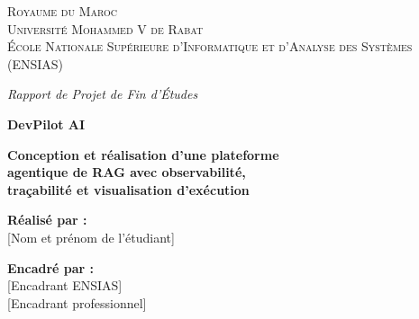\documentclass[12pt,a4paper,oneside]{report}
\begin{document}

\begin{titlepage}
\centering\thispagestyle{empty}
{\small\scshape Royaume du Maroc\\ Université Mohammed V de Rabat\\
École Nationale Supérieure d'Informatique et d'Analyse des Systèmes (ENSIAS)\par}
\vspace{0.8cm}{\color{lineGray}\rule{\textwidth}{0.5pt}}\vspace{1.0cm}

{\small\itshape Rapport de Projet de Fin d'Études\par}
\vspace{0.3cm}{\small en vue de l'obtention du diplôme d'Ingénieur d'État\par}

\vspace{1.4cm}
{\color{brand}\Huge\bfseries DevPilot AI\par}
\vspace{0.5cm}
{\LARGE\bfseries Conception et réalisation d'une plateforme\\[4pt]
agentique de RAG avec observabilité,\\[4pt]
traçabilité et visualisation d'exécution\par}

\vspace{1.6cm}{\color{lineGray}\rule{0.6\textwidth}{0.5pt}}\vspace{0.5cm}
\begin{minipage}{0.46\textwidth}\begin{flushleft}\large
\textbf{Réalisé par :}\\[2pt][Nom et prénom de l'étudiant]\end{flushleft}\end{minipage}\hfill
\begin{minipage}{0.46\textwidth}\begin{flushright}\large
\textbf{Encadré par :}\\[2pt][Encadrant ENSIAS]\\{[Encadrant professionnel]}\end{flushright}\end{minipage}


\end{titlepage}
\end{document}
